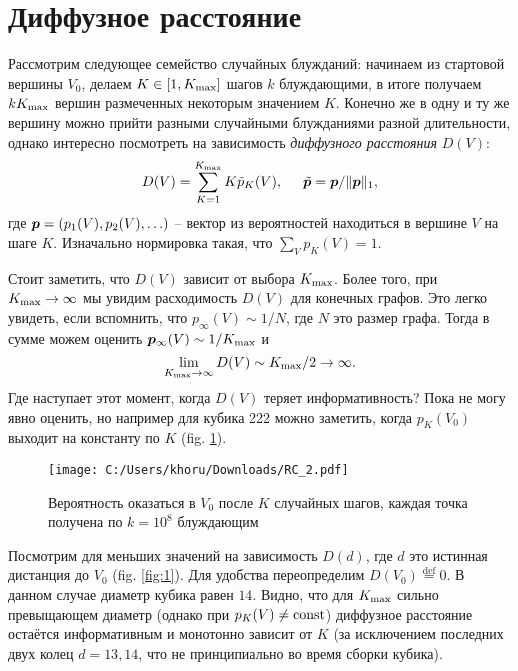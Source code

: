 \section{Диффузное расстояние}

Рассмотрим следующее семейство случайных блужданий: начинаем из стартовой вершины $V_0$, делаем $K \in [1, K_{\textnormal{max}}]$ шагов $k$ блуждающими, в итоге получаем $k K_{\textnormal{max}}$ вершин размеченных некоторым значением $K$. Конечно же в одну и ту же вершину можно прийти разными случайными блужданиями разной длительности, однако интересно посмотреть на зависимость \textit{диффузного расстояния} $D(V)$:
\begin{equation*}
    D(V) = \sum_{K=1}^{K_{\textnormal{max}}} K \tilde{p}_K(V),
    \hspace{5 mm} 
    \tilde{\boldsymbol{p}} = \boldsymbol{p} / \|\boldsymbol{p}\|_1,
\end{equation*}
где $\boldsymbol{p} = (p_1(V), p_2(V), \ldots)$ -- вектор из вероятностей находиться в вершине $V$ на шаге $K$. Изначально нормировка такая, что $\sum_V p_K(V) = 1$.


Стоит заметить, что $D(V)$ зависит от выбора $K_{\textnormal{max}}$. Более того, при $K_{\textnormal{max}} \to \infty$ мы увидим расходимость $D(V)$ для конечных графов. Это легко увидеть, если вспомнить, что $p_{\infty}(V) \sim 1/N$, где $N$ это размер графа. Тогда в сумме можем оценить $\boldsymbol{p}_{\infty}(V) \sim 1/K_{\textnormal{max}}$ и
\begin{equation*}
    \lim_{K_{\textnormal{max}} \to \infty} D(V) \sim K_{\textnormal{max}} / 2 \to \infty.
\end{equation*}
Где наступает этот момент, когда $D(V)$ теряет информативность? Пока не могу явно оценить, но например для кубика 222 можно заметить, когда $p_K(V_0)$ выходит на константу по $K$ (fig. \ref{fig:2}). 



\begin{figure}[h]
    \centering
    \texttt{[image: C:/Users/khoru/Downloads/RC\_2.pdf]}
    \caption{Вероятность оказаться в $V_0$ после $K$ случайных шагов, каждая точка получена по $k=10^{8}$ блуждающим}
    \label{fig:2}
\end{figure}



Посмотрим для меньших значений на зависимость $D(d)$, где $d$ это истинная дистанция до $V_0$ (fig. \ref{fig:1}). Для удобства переопределим $D(V_0) \overset{\mathrm{def}}{=} 0$. В данном случае диаметр кубика равен $14$. Видно, что для $K_{\textnormal{max}}$ сильно превыщающем диаметр (однако при $p_K(V) \neq \textnormal{const}$) диффузное расстояние остаётся информативным и монотонно зависит от $K$ (за исключением последних двух колец $d=13,14$, что не принципиально во время сборки кубика). 



